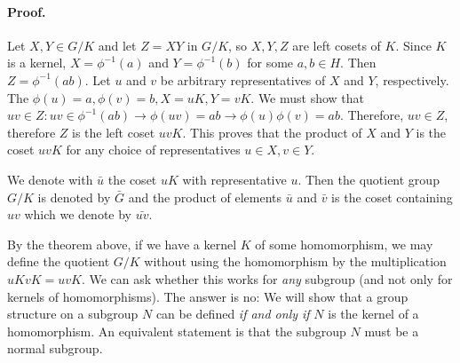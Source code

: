 \paragraph{Proof.} Let $X,Y \in G/K$ and let $Z = XY$ in $G/K$, so $X,Y,Z$ are left cosets of $K$. Since $K$ is a kernel, $X = \phi^{-1}(a)$ and $Y = \phi^{-1}(b)$ for some $a,b \in H$. Then $Z = \phi^{-1}(ab)$. Let $u$ and $v$ be arbitrary representatives of $X$ and $Y$, respectively. The $\phi(u) = a, \phi(v) = b, X = uK, Y = vK$. We must show that $uv \in Z: uv \in \phi^{-1}(ab) \rightarrow \phi(uv) = ab \rightarrow \phi(u)\phi(v) = ab$. Therefore, $uv \in Z$, therefore $Z$ is the left coset $uvK$. This proves that the product of $X$ and $Y$ is the coset $uvK$ for any choice of representatives $u \in X, v \in Y$.

We denote with $\bar{u}$ the coset $uK$ with representative $u$. Then the quotient group $G/K$ is denoted by $\bar{G}$ and the product of elements $\bar{u}$ and $\bar{v}$ is the coset containing $uv$ which we denote by $\bar{uv}$.


By the theorem above, if we have a kernel $K$ of some homomorphism, we may define the quotient $G/K$ without using the homomorphism by the multiplication $uKvK = uvK$. We can ask whether this works for \emph{any} subgroup (and not only for kernels of homomorphisms). The answer is no: We will show that a group structure on a subgroup $N$ can be defined \emph{if and only if} $N$ is the kernel of a homomorphism. An equivalent statement is that the subgroup $N$ must be a normal subgroup.


